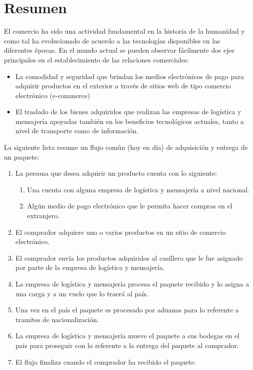 \documentclass[12pt,a4paper]{article}
\begin{document}
\section{Resumen}
El comercio ha sido una actividad fundamental en la historia de la humanidad y como tal ha evolucionado de acuerdo a las tecnologías disponibles en las diferentes épocas. 
En el mundo actual se pueden observar fácilmente dos ejes principales en el establecimiento de las relaciones comerciales: 
\begin{itemize}
\item La comodidad y seguridad que brindan los medios electrónicos de pago para adquirir productos en el exterior a través de sitios web de tipo comercio electrónico (e-commerce)
\item El traslado de los bienes adquiridos que realizan las empresas de logística y mensajería apoyadas también en los beneficios tecnológicos actuales, tanto a nivel de transporte como de información.
\end{itemize} 
La siguiente lista resume un flujo común (hoy en día) de adquisición y entrega de un paquete:
\begin{enumerate}
\item La persona que desea adquirir un producto cuenta con lo siguiente:
\begin{enumerate}
\item Una cuenta con alguna empresa de logística y mensajería a nivel nacional.
\item Algún medio de pago electrónico que le permita hacer compras en el extranjero.
\end{enumerate}
\item El comprador adquiere uno o varios productos en un sitio de comercio electrónico.
\item El comprador envía los productos adquiridos al casillero que le fue asignado por parte de la empresa de logística y mensajería.
\item La empresa de logística y mensajería procesa el paquete recibido y lo asigna a una carga y a un vuelo que lo traerá al país.
\item Una vez en el país el paquete es procesado por aduanas para lo referente a tramites de nacionalización.
\item La empresa de logística y mensajería mueve el paquete a sus bodegas en el pais para proseguir con lo referente a la entrega del paquete al comprador.
\item El flujo finaliza cuando el comprador ha recibido el paquete.
\end{enumerate}
\end{document}

